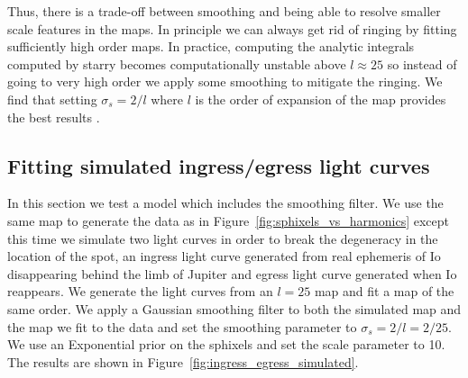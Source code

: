 \documentclass[modern]{aastex62}
\begin{document}
Thus, there is a trade-off between smoothing and being able to resolve smaller scale features
in the maps. 
In principle we can always get rid of ringing by fitting sufficiently high order maps.
In practice, computing the analytic integrals computed by \textsf{starry} becomes computationally unstable above $l\approx 25$ so instead of going to very high order we apply some smoothing to mitigate the ringing.
We find that setting $\sigma_s=2/l$ where $l$ is the order of expansion of the map provides the best results .

\subsection{Fitting simulated ingress/egress light curves}
In this section we test a model which includes the smoothing filter. 
We use the same map to generate the data as in Figure~\ref{fig:sphixels_vs_harmonics} except this time we simulate two light curves in order to break the degeneracy in the location of the spot, an ingress light curve generated from real ephemeris of Io disappearing behind the limb of Jupiter and egress light curve generated when Io reappears.
We generate the light curves from an $l=25$ map and fit a map of the same order. 
We apply a Gaussian smoothing filter to both the simulated map and the map we fit to the data and set the smoothing parameter to $\sigma_s=2/l=2/25$. 
We use an Exponential prior on the sphixels and set the scale parameter to 10.
The results are shown in Figure~\ref{fig:ingress_egress_simulated}.
\end{document}

